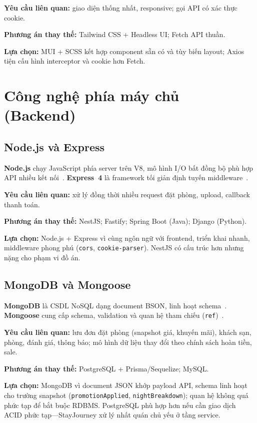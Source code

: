 \documentclass[../DoAn.tex]{subfiles}
\begin{document}
\textbf{Yêu cầu liên quan:} giao diện thống nhất, responsive; gọi API có xác thực cookie.

\textbf{Phương án thay thế:} Tailwind CSS + Headless UI; Fetch API thuần.

\textbf{Lựa chọn:} MUI + SCSS kết hợp component sẵn có và tùy biến layout; Axios tiện cấu hình interceptor và cookie hơn Fetch.

\section{Công nghệ phía máy chủ (Backend)}
\label{section:3.4}

\subsection{Node.js và Express}

\textbf{Node.js} chạy JavaScript phía server trên V8, mô hình I/O bất đồng bộ phù hợp API nhiều kết nối~\cite{nodejs2024}. \textbf{Express~4} là framework tối giản định tuyến middleware~\cite{express2024}.

\textbf{Yêu cầu liên quan:} xử lý đồng thời nhiều request đặt phòng, upload, callback thanh toán.

\textbf{Phương án thay thế:} NestJS; Fastify; Spring Boot (Java); Django (Python).

\textbf{Lựa chọn:} Node.js + Express vì cùng ngôn ngữ với frontend, triển khai nhanh, middleware phong phú (\texttt{cors}, \texttt{cookie-parser}). NestJS có cấu trúc hơn nhưng nặng cho phạm vi đồ án.

\subsection{MongoDB và Mongoose}

\textbf{MongoDB} là CSDL NoSQL dạng document BSON, linh hoạt schema~\cite{mongodb2024}. \textbf{Mongoose} cung cấp schema, validation và quan hệ tham chiếu (\texttt{ref})~\cite{mongoose2024}.

\textbf{Yêu cầu liên quan:} lưu đơn đặt phòng (snapshot giá, khuyến mãi), khách sạn, phòng, đánh giá, thông báo; mô hình dữ liệu thay đổi theo chính sách hoàn tiền, sale.

\textbf{Phương án thay thế:} PostgreSQL + Prisma/Sequelize; MySQL.

\textbf{Lựa chọn:} MongoDB vì document JSON khớp payload API, schema linh hoạt cho trường snapshot (\texttt{promotionApplied}, \texttt{nightBreakdown}); quan hệ không quá phức tạp để bắt buộc RDBMS. PostgreSQL phù hợp hơn nếu cần giao dịch ACID phức tạp---StayJourney xử lý nhất quán chủ yếu ở tầng service.
\end{document}

